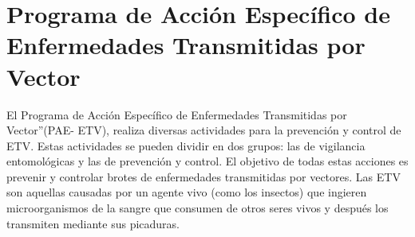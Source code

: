 \documentclass[
  letterpaper,
  twocolumn,
  landscape]{report}
\begin{document}
\section{Programa de Acción Específico de Enfermedades Transmitidas por
Vector}\label{programa-de-acciuxf3n-especuxedfico-de-enfermedades-transmitidas-por-vector}

El Programa de Acción Específico de Enfermedades Transmitidas por
Vector''(PAE- ETV), realiza diversas actividades para la prevención y
control de ETV. Estas actividades se pueden dividir en dos grupos: las
de vigilancia entomológicas y las de prevención y control. El objetivo
de todas estas acciones es prevenir y controlar brotes de enfermedades
transmitidas por vectores. Las ETV son aquellas causadas por un agente
vivo (como los insectos) que ingieren microorganismos de la sangre que
consumen de otros seres vivos y después los transmiten mediante sus
picaduras.
\end{document}
